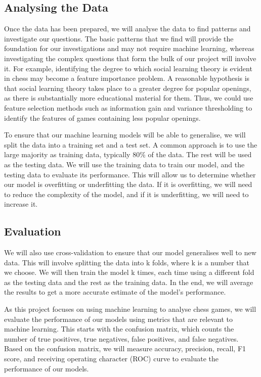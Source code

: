 \documentclass[%
 superscriptaddress,
showpacs,preprintnumbers,
 amsmath,
 amssymb,
 aps,
 pra,
showkeys,
onecolumn,
notitlepage,
11pt,
tightenlines      %
]{revtex4-1}
\begin{document}
\subsection{Analysing the Data}
Once the data has been prepared, we will analyse the data to find patterns and investigate our questions. The basic patterns that we find will provide the foundation for our investigations and may not require machine learning, whereas investigating the complex questions that form the bulk of our project will involve it. For example, identifying the degree to which social learning theory is evident in chess may become a feature importance problem. A reasonable hypothesis is that social learning theory takes place to a greater degree for popular openings, as there is substantially more educational material for them. Thus, we could use feature selection methods such as information gain and variance thresholding to identify the features of games containing less popular openings.

To ensure that our machine learning models will be able to generalise, we will split the data into a training set and a test set. A common approach is to use the large majority as training data, typically 80\% of the data. The rest will be used as the testing data. We will use the training data to train our model, and the testing data to evaluate its performance. This will allow us to determine whether our model is overfitting or underfitting the data. If it is overfitting, we will need to reduce the complexity of the model, and if it is underfitting, we will need to increase it.

\subsection{Evaluation}
We will also use cross-validation to ensure that our model generalises well to new data. This will involve splitting the data into k folds, where k is a number that we choose. We will then train the model k times, each time using a different fold as the testing data and the rest as the training data. In the end, we will average the results to get a more accurate estimate of the model's performance.

As this project focuses on using machine learning to analyse chess games, we will evaluate the performance of our models using metrics that are relevant to machine learning. This starts with the confusion matrix, which counts the number of true positives, true negatives, false positives, and false negatives. Based on the confusion matrix, we will measure accuracy, precision, recall, F1 score, and receiving operating character (ROC) curve to evaluate the performance of our models.
\end{document}
